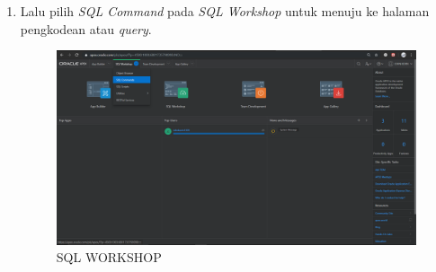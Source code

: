 \documentclass[a4paper, 12pt]{article}
\begin{document}
\begin{enumerate}
\item Lalu pilih \textit{SQL Command} pada \textit{SQL Workshop} untuk menuju ke halaman pengkodean atau \textit{query}.
\begin{figure}[h]
\begin{center}
\includegraphics[width=12cm]{figure/SC.png}
\caption{SQL WORKSHOP}
\end{center}
\end{figure}


\end{enumerate}
\end{document}
